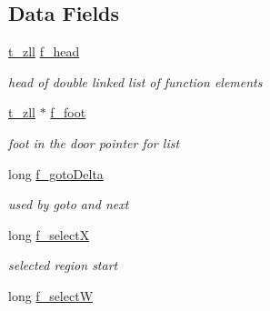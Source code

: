 \subsection*{Data Fields}
\begin{DoxyCompactItemize}
\item 
\hypertarget{structt__funbuff_aa8e89ed478dde0fe43c06b7e9ded30fb}{
\hyperlink{structt__zll}{t\_\-zll} \hyperlink{structt__funbuff_aa8e89ed478dde0fe43c06b7e9ded30fb}{f\_\-head}}
\label{structt__funbuff_aa8e89ed478dde0fe43c06b7e9ded30fb}

\begin{DoxyCompactList}\small\item\em head of double linked list of function elements \item\end{DoxyCompactList}\item 
\hypertarget{structt__funbuff_ab04e7310b18025038e58a2160c5ec664}{
\hyperlink{structt__zll}{t\_\-zll} $\ast$ \hyperlink{structt__funbuff_ab04e7310b18025038e58a2160c5ec664}{f\_\-foot}}
\label{structt__funbuff_ab04e7310b18025038e58a2160c5ec664}

\begin{DoxyCompactList}\small\item\em foot in the door pointer for list \item\end{DoxyCompactList}\item 
\hypertarget{structt__funbuff_a568134bf64ed0e63f11a6cbf87a7a94c}{
long \hyperlink{structt__funbuff_a568134bf64ed0e63f11a6cbf87a7a94c}{f\_\-gotoDelta}}
\label{structt__funbuff_a568134bf64ed0e63f11a6cbf87a7a94c}

\begin{DoxyCompactList}\small\item\em used by goto and next \item\end{DoxyCompactList}\item 
\hypertarget{structt__funbuff_a88c777274c3305975aa9c4efc1b3d679}{
long \hyperlink{structt__funbuff_a88c777274c3305975aa9c4efc1b3d679}{f\_\-selectX}}
\label{structt__funbuff_a88c777274c3305975aa9c4efc1b3d679}

\begin{DoxyCompactList}\small\item\em selected region start \item\end{DoxyCompactList}\item 
\hypertarget{structt__funbuff_a6560c1e97cb6971637b95e47fd07c854}{
long \hyperlink{structt__funbuff_a6560c1e97cb6971637b95e47fd07c854}{f\_\-selectW}}
\label{structt__funbuff_a6560c1e97cb6971637b95e47fd07c854}


\end{DoxyCompactItemize}
